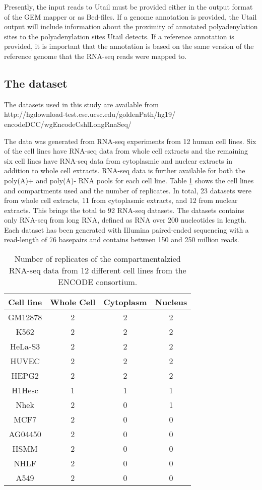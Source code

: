 Presently, the input reads to Utail must be provided either in the output
format of the GEM mapper \cite{marco-sola_gem_2012} or as Bed-files. If a
genome annotation is provided, the Utail output will include information about
the proximity of annotated polyadenylation sites to the polyadenylation sites
Utail detects. If a reference annotation is provided, it is important that the
annotation is based on the same version of the reference genome that the
RNA-seq reads were mapped to.

\subsection{The dataset}
The datasets used in this study are available from \\
http://hgdownload-test.cse.ucsc.edu/goldenPath/hg19/\\
encodeDCC/wgEncodeCshlLongRnaSeq/

The data was generated from RNA-seq experiments from 12 human cell lines. Six
of the cell lines have RNA-seq data from whole cell extracts and the remaining
six cell lines have RNA-seq data from cytoplasmic and nuclear extracts in
addition to whole cell extracts. RNA-seq data is further available for both the
poly(A)+ and poly(A)- RNA pools for each cell line. Table \ref{tab:datasets}
shows the cell lines and compartments used and the number of replicates. In
total, 23 datasets were from whole cell extracts, 11 from cytoplasmic extracts,
and 12 from nuclear extracts. This brings the total to 92 RNA-seq datasets. The
datasets contains only RNA-seq from long RNA, defined as RNA over 200
nucleotides in length. Each dataset has been generated with Illumina
paired-ended sequencing with a read-length of 76 basepairs and contains between
150 and 250 million reads.

\begin{table}[hb]
	\centering
	\begin{tabular}{cccc}
	  Cell line & Whole Cell & Cytoplasm & Nucleus \\
	  \midrule
	  GM12878 & 2 & 2 & 2 \\
	  K562 & 2 & 2 & 2 \\
	  HeLa-S3 & 2 & 2 & 2 \\
	  HUVEC & 2 & 2 & 2 \\
	  HEPG2 & 2 & 2 & 2 \\
	  H1Hesc & 1 & 1 & 1 \\
	  Nhek & 2 & 0 & 1 \\
	  MCF7 & 2 & 0 & 0 \\
	  AG04450 & 2 & 0 & 0 \\
	  HSMM & 2 & 0 & 0 \\
	  NHLF & 2 & 0 & 0 \\
	  A549 & 2 & 0 & 0 \\
	\end{tabular}
	\caption{Number of replicates of the compartmentalzied RNA-seq data from 12
	different cell lines from the ENCODE consortium.}
	\label{tab:datasets}
\end{table}

